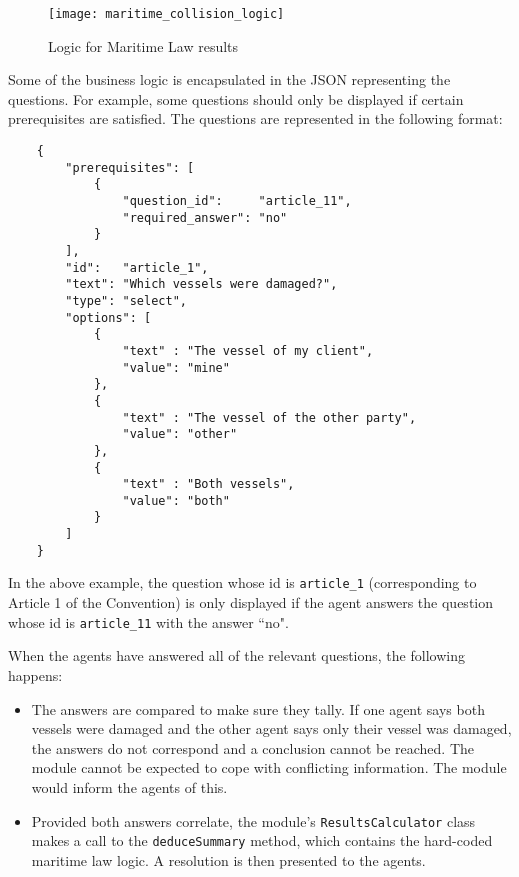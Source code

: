 \begin{figure}[h!]
  \centering
    \ifimages
    \texttt{[image: maritime\_collision\_logic]}
    \fi
  \caption{Logic for Maritime Law results}
  \label{uml:maritimeLogic}
\end{figure}

Some of the business logic is encapsulated in the JSON representing the questions. For example, some questions should only be displayed if certain prerequisites are satisfied. The questions are represented in the following format:

\begin{minipage}{\textwidth}
\begin{lstlisting}
    {
        "prerequisites": [
            {
                "question_id":     "article_11",
                "required_answer": "no"
            }
        ],
        "id":   "article_1",
        "text": "Which vessels were damaged?",
        "type": "select",
        "options": [
            {
                "text" : "The vessel of my client",
                "value": "mine"
            },
            {
                "text" : "The vessel of the other party",
                "value": "other"
            },
            {
                "text" : "Both vessels",
                "value": "both"
            }
        ]
    }
\end{lstlisting}
\end{minipage}

In the above example, the question whose id is \lstinline{article_1} (corresponding to Article 1 of the Convention) is only displayed if the agent answers the question whose id is \lstinline{article_11} with the answer ``no".

When the agents have answered all of the relevant questions, the following happens:

\begin{itemize}
    \item The answers are compared to make sure they tally. If one agent says both vessels were damaged and the other agent says only their vessel was damaged, the answers do not correspond and a conclusion cannot be reached. The module cannot be expected to cope with conflicting information. The module would inform the agents of this.
    \item Provided both answers correlate, the module's \lstinline{ResultsCalculator} class makes a call to the \lstinline{deduceSummary} method, which contains the hard-coded maritime law logic. A resolution is then presented to the agents.
\end{itemize}

